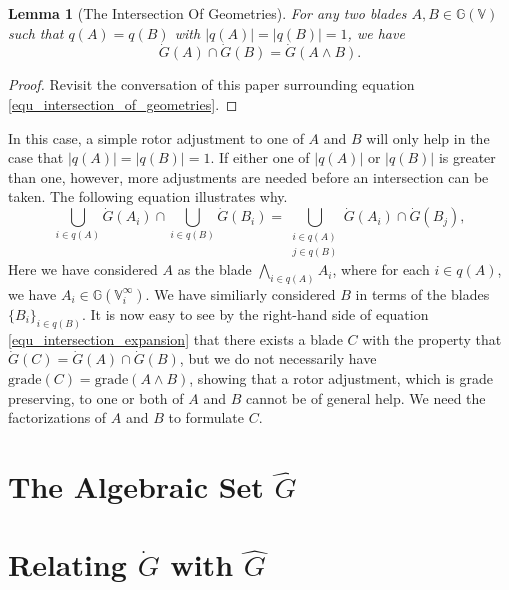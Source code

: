 \documentclass{birkjour}
\newtheorem{lem}[thm]{Lemma}
\theoremstyle{definition}
\theoremstyle{remark}
\numberwithin{equation}{section}
\newcommand{\G}{\mathbb{G}}
\newcommand{\V}{\mathbb{V}}
\newcommand{\Gi}{\dot{G}}
\newcommand{\Go}{\hat{G}}
\begin{document}
\begin{lem}[The Intersection Of Geometries]
For any two blades $A,B\in\G(\V)$ such that $q(A)=q(B)$
with $|q(A)|=|q(B)|=1$, we have
\begin{equation}
\Gi(A)\cap\Gi(B)=\Gi(A\wedge B).
\end{equation}
\end{lem}
\begin{proof}
Revisit the conversation of this paper surrounding equation \eqref{equ_intersection_of_geometries}.
\end{proof}
In this case, a simple rotor adjustment to one of $A$ and $B$ will only help
in the case that $|q(A)|=|q(B)|=1$.  If either one of $|q(A)|$ or $|q(B)|$
is greater than one, however, more adjustments are needed before an intersection can
be taken.  The following equation illustrates why.
\begin{equation}\label{equ_intersection_expansion}
\bigcup_{i\in q(A)}\Gi(A_i)\cap\bigcup_{i\in q(B)}\Gi(B_i) =
\bigcup_{\substack{i\in q(A)\\j\in q(B)}} \Gi(A_i)\cap \Gi(B_j),
\end{equation}
Here we have considered $A$ as the blade $\bigwedge_{i\in q(A)}A_i$, where
for each $i\in q(A)$, we have $A_i\in\G(\V_i^\infty)$.  We have similiarly
considered $B$ in terms of the blades $\{B_i\}_{i\in q(B)}$.  It is now
easy to see by the right-hand side of equation \eqref{equ_intersection_expansion}
that there exists a blade $C$
with the property that $\Gi(C)=\Gi(A)\cap\Gi(B)$, but we do not necessarily
have $\mbox{grade}(C)=\mbox{grade}(A\wedge B)$, showing that a rotor
adjustment, which is grade preserving, to one or both of $A$ and $B$ cannot
be of general help.  We need the factorizations of $A$ and $B$ to formulate $C$.





\section{The Algebraic Set $\Go$}

\section{Relating $\Gi$ with $\Go$}







\end{document}
